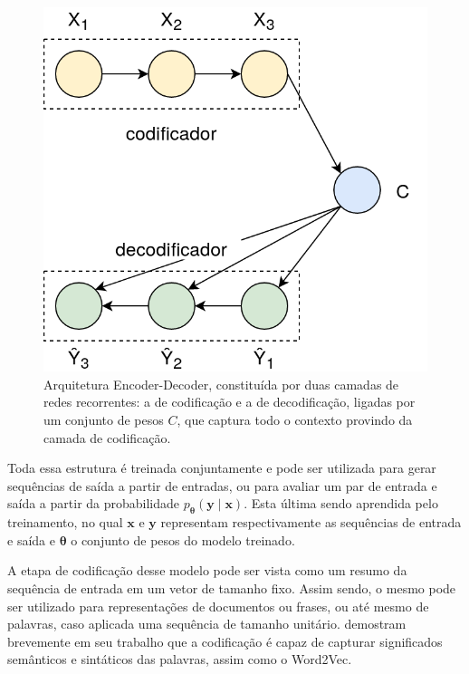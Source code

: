 \begin{figure}
\begin{center} {
    \begin{center}
    \includegraphics[scale=0.30]{images/encoder_decoder.png}
    \caption{Arquitetura Encoder-Decoder, constituída por duas camadas de redes
             recorrentes: a de codificação e a de decodificação, ligadas por um
             conjunto de pesos $C$, que captura todo o contexto provindo da
             camada de codificação.}
    \label{fig:encoder_decoder}
    \end{center}
}
\end{center}
\end{figure}

Toda essa estrutura é treinada conjuntamente e pode ser utilizada para gerar
sequências de saída a partir de entradas, ou para avaliar um par de entrada e
saída a partir da probabilidade $p_{\mathbf{\theta}}(\mathbf{y} \mid \mathbf{x})$.
Esta última sendo aprendida pelo treinamento, no qual $\mathbf{x}$ e $\mathbf{y}$
representam respectivamente as sequências de entrada e saída e $\mathbf{\theta}$
o conjunto de pesos do modelo treinado.

A etapa de codificação desse modelo pode ser vista como um resumo da sequência
de entrada em um vetor de tamanho fixo.
Assim sendo, o mesmo pode ser utilizado para representações de documentos ou
frases, ou até mesmo de palavras, caso aplicada uma sequência de tamanho unitário.
\citet{cho14} demostram brevemente em seu trabalho que a codificação é capaz de
capturar significados semânticos e sintáticos das palavras, assim como o Word2Vec.

